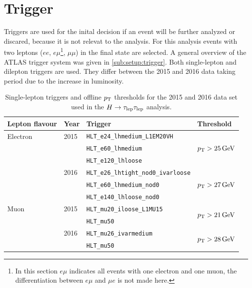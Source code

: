 \section{Trigger}\label{sec:event_selection:trigger}

Triggers are used for the inital decision if an event will be further analyzed or discared, because it is not relevat to the analysis.
For this analysis events with two leptons ($ee$, $e\mu$\footnote{In this section $e\mu$ indicates all events
with one electron and one muon, the differentiation between $e\mu$ and $\mu e$ is not made here.}, $\mu\mu$) in the final state are selected.
A general overview of the ATLAS trigger system was given in \cref{sub:setup:trigger}.
Both single-lepton and dilepton triggers are used.
They differ between the 2015 and 2016 data taking period due to the increase in luminosity.

\begin{table}[htpb]
    \centering
    \caption{Single-lepton triggers and offline $p_\text{T}$ thresholds for the 2015 and 2016 data set used in the $H \to \tau_\text{lep} \tau_\text{lep}$ analysis.}\label{tab:event_selection:trigger:single}
    \begin{tabular}{@{}llll@{}}
        \toprule
        Lepton flavour & Year & Trigger & Threshold \\ \midrule
        Electron       & 2015 & \texttt{HLT\_e24\_lhmedium\_L1EM20VH} & \multirow{3}{*}{$\pt > \SI{25}{\GeV}$} \\
                       &      & \texttt{HLT\_e60\_lhmedium} \\
                       &      & \texttt{HLT\_e120\_lhloose} \\ \cmidrule(l){2-4}
                       & 2016 & \texttt{HLT\_e26\_lhtight\_nod0\_ivarloose} & \multirow{3}{*}{$\pt > \SI{27}{\GeV}$} \\
                       &      & \texttt{HLT\_e60\_lhmedium\_nod0} \\
                       &      & \texttt{HLT\_e140\_lhloose\_nod0} \\ \midrule
        Muon           & 2015 & \texttt{HLT\_mu20\_iloose\_L1MU15} & \multirow{2}{*}{$\pt > \SI{21}{\GeV}$} \\
                       &      & \texttt{HLT\_mu50} \\ \cmidrule(l){2-4}
                       & 2016 & \texttt{HLT\_mu26\_ivarmedium} & \multirow{2}{*}{$\pt > \SI{28}{\GeV}$} \\
                       &      & \texttt{HLT\_mu50} \\
        \bottomrule
    \end{tabular}
\end{table}

